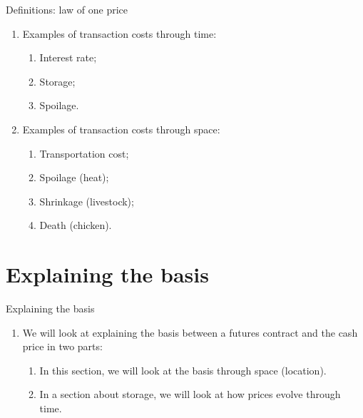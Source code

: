 \documentclass[table,xcolor=pdftex,dvipsnames]{beamer}\usepackage[]{graphicx}\usepackage[]{color}
\begin{document}

\begin{frame}{Definitions: law of one price}
\begin{enumerate}[label=\textbullet]
    \item Examples of transaction costs through time:
        \begin{enumerate}[label=-]
          \item Interest rate;
          \item Storage;
          \item Spoilage.
       \end{enumerate}
    \item Examples of transaction costs through space:
        \begin{enumerate}[label=-]
          \item Transportation cost;
          \item Spoilage (heat);
          \item Shrinkage (livestock);
          \item Death (chicken).
       \end{enumerate}
\end{enumerate}
\end{frame}


\section{Explaining the basis}

\begin{frame}{Explaining the basis}
\begin{enumerate}[label=\textbullet]
    \item We will look at explaining the basis between a futures contract and the cash price in two parts:
        \begin{enumerate}[label=-]
              \item In this section, we will look at the basis through space (location).
              \item In a section about storage, we will look at how prices evolve through time.
       \end{enumerate}
\end{enumerate}
\end{frame}


\end{document}
